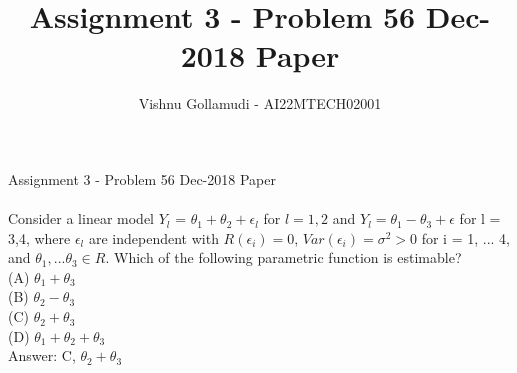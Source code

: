 \documentclass{article}
\title{Assignment 3 - Problem 56 Dec-2018 Paper}
\author{Vishnu Gollamudi - AI22MTECH02001}
\begin{document}
\large  {Assignment 3 - Problem 56 Dec-2018 Paper}\\
\\
Consider a linear model $Y_l$ = $\theta_1 + \theta_2 + \epsilon_l$ for $l = 1,2$ and $Y_l = \theta_1-\theta_3 + \epsilon$ for l = 3,4, where $\epsilon_l$ are independent with $R(\epsilon_i) = 0$, $Var (\epsilon_i) = \sigma ^{2} > 0$ for i = 1, ... 4, and $\theta_1,... \theta_3 \in R$. Which of the following parametric function is estimable? 
\\
(A) $\theta_1 + \theta_3$ \\
(B) $\theta_2 - \theta_3$  \\
(C) $\theta_2 + \theta_3$ \\
(D) $\theta_1 + \theta_2 + \theta_3$ \\

Answer: C, $\theta_2 + \theta_3$ \\
\end{document}
